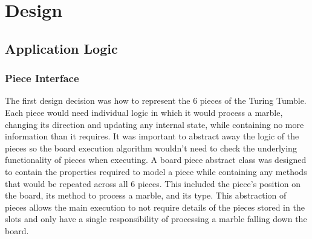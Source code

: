 \documentclass{l4proj}
\begin{document}
\chapter{Design}
\section{Application Logic}
\label{section:design}

\subsection{Piece Interface}
The first design decision was how to represent the 6 pieces of the Turing Tumble. Each piece would need individual logic in which it would process a marble, changing its direction and updating any internal state, while containing no more information than it requires. It was important to abstract away the logic of the pieces so the board execution algorithm wouldn't need to check the underlying functionality of pieces when executing. A board piece abstract class was designed to contain the properties required to model a piece while containing any methods that would be repeated across all 6 pieces. This included the piece's position on the board, its method to process a marble, and its type. This abstraction of pieces allows the main execution to not require details of the pieces stored in the slots and only have a single responsibility of processing a marble falling down the board.
\end{document}
